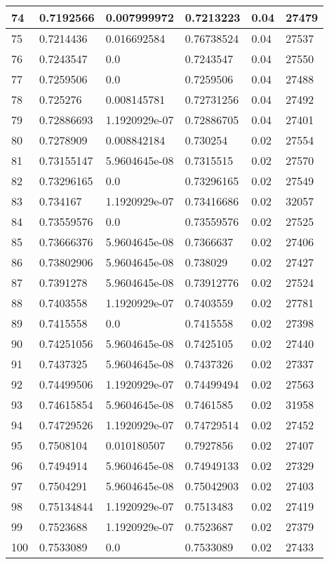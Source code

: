 \begin{longtable}{|l|l|l|l|l|l|}
74 & 0.7192566 & 0.007999972 & 0.7213223 & 0.04 & 27479 \\ \hline 
75 & 0.7214436 & 0.016692584 & 0.76738524 & 0.04 & 27537 \\ \hline 
76 & 0.7243547 & 0.0 & 0.7243547 & 0.04 & 27550 \\ \hline 
77 & 0.7259506 & 0.0 & 0.7259506 & 0.04 & 27488 \\ \hline 
78 & 0.725276 & 0.008145781 & 0.72731256 & 0.04 & 27492 \\ \hline 
79 & 0.72886693 & 1.1920929e-07 & 0.72886705 & 0.04 & 27401 \\ \hline 
80 & 0.7278909 & 0.008842184 & 0.730254 & 0.02 & 27554 \\ \hline 
81 & 0.73155147 & 5.9604645e-08 & 0.7315515 & 0.02 & 27570 \\ \hline 
82 & 0.73296165 & 0.0 & 0.73296165 & 0.02 & 27549 \\ \hline 
83 & 0.734167 & 1.1920929e-07 & 0.73416686 & 0.02 & 32057 \\ \hline 
84 & 0.73559576 & 0.0 & 0.73559576 & 0.02 & 27525 \\ \hline 
85 & 0.73666376 & 5.9604645e-08 & 0.7366637 & 0.02 & 27406 \\ \hline 
86 & 0.73802906 & 5.9604645e-08 & 0.738029 & 0.02 & 27427 \\ \hline 
87 & 0.7391278 & 5.9604645e-08 & 0.73912776 & 0.02 & 27524 \\ \hline 
88 & 0.7403558 & 1.1920929e-07 & 0.7403559 & 0.02 & 27781 \\ \hline 
89 & 0.7415558 & 0.0 & 0.7415558 & 0.02 & 27398 \\ \hline 
90 & 0.74251056 & 5.9604645e-08 & 0.7425105 & 0.02 & 27440 \\ \hline 
91 & 0.7437325 & 5.9604645e-08 & 0.7437326 & 0.02 & 27337 \\ \hline 
92 & 0.74499506 & 1.1920929e-07 & 0.74499494 & 0.02 & 27563 \\ \hline 
93 & 0.74615854 & 5.9604645e-08 & 0.7461585 & 0.02 & 31958 \\ \hline 
94 & 0.74729526 & 1.1920929e-07 & 0.74729514 & 0.02 & 27452 \\ \hline 
95 & 0.7508104 & 0.010180507 & 0.7927856 & 0.02 & 27407 \\ \hline 
96 & 0.7494914 & 5.9604645e-08 & 0.74949133 & 0.02 & 27329 \\ \hline 
97 & 0.7504291 & 5.9604645e-08 & 0.75042903 & 0.02 & 27403 \\ \hline 
98 & 0.75134844 & 1.1920929e-07 & 0.7513483 & 0.02 & 27419 \\ \hline 
99 & 0.7523688 & 1.1920929e-07 & 0.7523687 & 0.02 & 27379 \\ \hline 
100 & 0.7533089 & 0.0 & 0.7533089 & 0.02 & 27433 \\ \hline 
\end{longtable}